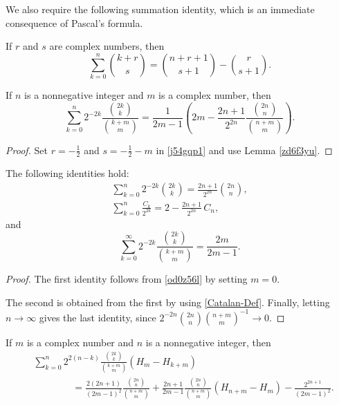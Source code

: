 \documentclass[12pt,reqno]{article}
\begin{document}
We also require the following summation identity, which is an immediate consequence of Pascal's formula.
\begin{lemma}
If $r$ and $s$ are complex numbers, then
\begin{equation}\label{j54gqp1}
\sum_{k = 0}^n \binom{{k + r}}{s} = \binom{n+r+1}{s+1} - \binom{{r}}{{s + 1}}.
\end{equation}
\end{lemma}
\begin{proposition}
If $n$ is a nonnegative integer and $m$ is a complex number, then
\begin{equation}\label{od0z56l}
\sum_{k = 0}^n 2^{-2k} \frac{\binom{2k}{k}}{\binom{k+m}{m}} = \frac{1}{2m - 1}\left (2m - \frac{2n+1}{2^{2n}} \frac{\binom{2n}{n}}{\binom{n+m}{m}} \right)\!.
\end{equation}
\end{proposition}
\begin{proof}
Set $r=-\frac12$ and $s=-\frac12-m$ in \eqref{j54gqp1} and use Lemma \ref{zd6f3yu}.
\end{proof}
\begin{corollary}\label{Cor3} 
The following identities hold:
\begin{gather*}
\sum_{k = 0}^n 2^{- 2k} \binom{{2k}}{k} = \frac{2n + 1}{2^{2n}}\binom{2n}{n}, \\
\sum_{k = 0}^n \frac{C_k}{2^{2k}} = 2 - \frac{2n + 1}{2^{2n}}\,C_n, 
\end{gather*}
and
\begin{equation*}
\sum_{k = 0}^\infty 2^{- 2k} \frac{\binom{2k}{k}}{\binom{k + m}{m}} = \frac{2m}{2m - 1}.
\end{equation*}
\end{corollary}
\begin{proof}
The first identity follows from \eqref{od0z56l} by setting $m=0$. 

The second is obtained from the first by using \eqref{Catalan-Def}.
Finally, letting $n\to\infty$ gives the last identity, since  $2^{-2n}{\binom{2n}{n}}{\binom{n+m}{m}}^{-1}\to 0.$
\end{proof}
\begin{proposition}\label{Prop4}
	If $m$ is a complex number and $n$ is a nonnegative integer, then
	\begin{align*}
	&\sum_{k = 0}^n {2^{2(n - k)} \frac{\binom{{2k}}{k}}{\binom{{k + m}}{m}} ( H_m - {H_{k + m} } )}\nonumber\\ 
	&\qquad\qquad =   \frac{2(2n + 1)}{ {(2m - 1)}^2 } \frac{\binom{2n}{n}}{\binom{{n + m}}{m}} + \frac{ {2n + 1}}{2m - 1} \frac{\binom{2n}{n}}{\binom{{n + m}}{m}}( {H_{n + m}  - H_m } ) - \frac{2^{2n+1}}{{\left( {2m - 1} \right)^2 }}.
	\end{align*}
\end{proposition}
\end{document}
